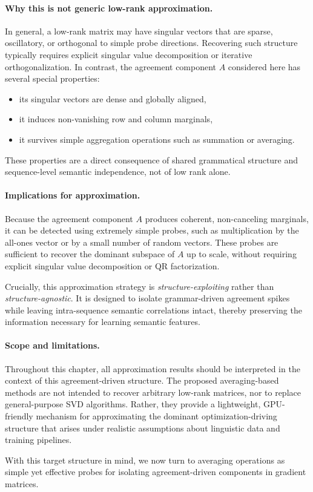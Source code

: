 \paragraph{Why this is not generic low-rank approximation.}
In general, a low-rank matrix may have singular vectors that are sparse,
oscillatory, or orthogonal to simple probe directions.
Recovering such structure typically requires explicit singular value
decomposition or iterative orthogonalization.
In contrast, the agreement component $A$ considered here has several special
properties:
\begin{itemize}
    \item its singular vectors are dense and globally aligned,
    \item it induces non-vanishing row and column marginals,
    \item it survives simple aggregation operations such as summation or averaging.
\end{itemize}
These properties are a direct consequence of shared grammatical structure and
sequence-level semantic independence, not of low rank alone.

\paragraph{Implications for approximation.}
Because the agreement component $A$ produces coherent, non-canceling marginals,
it can be detected using extremely simple probes, such as multiplication by the
all-ones vector or by a small number of random vectors.
These probes are sufficient to recover the dominant subspace of $A$ up to scale,
without requiring explicit singular value decomposition or QR factorization.

Crucially, this approximation strategy is \emph{structure-exploiting} rather than
\emph{structure-agnostic}.
It is designed to isolate grammar-driven agreement spikes while leaving
intra-sequence semantic correlations intact, thereby preserving the information
necessary for learning semantic features.

\paragraph{Scope and limitations.}
Throughout this chapter, all approximation results should be interpreted in the
context of this agreement-driven structure.
The proposed averaging-based methods are not intended to recover arbitrary
low-rank matrices, nor to replace general-purpose SVD algorithms.
Rather, they provide a lightweight, GPU-friendly mechanism for approximating the
dominant optimization-driving structure that arises under realistic assumptions
about linguistic data and training pipelines.

With this target structure in mind, we now turn to averaging operations as simple
yet effective probes for isolating agreement-driven components in gradient
matrices.